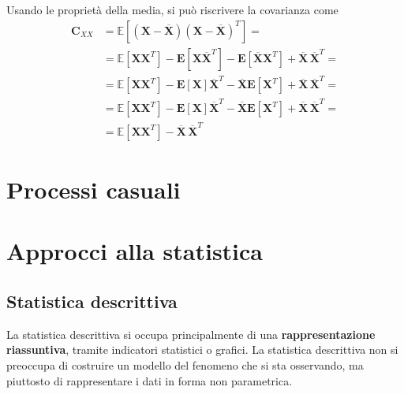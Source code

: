Usando le proprietà della media, si può riscrivere la covarianza come
\begin{equation}
\begin{aligned}
    \mathbf{C}_{XX} & = \mathbb{E}[(\mathbf{X} - \overline{\mathbf{X}})(\mathbf{X} - \overline{\mathbf{X}})^T] = \\
    & = \mathbb{E}[\mathbf{X} \mathbf{X}^T] - \mathbf{E}[\mathbf{X}\overline{\mathbf{X}}^T] - \mathbf{E}[\overline{\mathbf{X}}\mathbf{X}^T] + \overline{\mathbf{X}} \, \overline{\mathbf{X}}^T = \\
    & = \mathbb{E}[\mathbf{X} \mathbf{X}^T] - \mathbf{E}[\mathbf{X}]\overline{\mathbf{X}}^T - \overline{\mathbf{X}}\mathbf{E}[\mathbf{X}^T] + \overline{\mathbf{X}} \, \overline{\mathbf{X}}^T = \\
    & = \mathbb{E}[\mathbf{X} \mathbf{X}^T] - \mathbf{E}[\mathbf{X}]\overline{\mathbf{X}}^T - \overline{\mathbf{X}}\mathbf{E}[\mathbf{X}^T] + \overline{\mathbf{X}} \, \overline{\mathbf{X}}^T = \\
    & = \mathbb{E}[\mathbf{X} \mathbf{X}^T] - \overline{\mathbf{X}} \, \overline{\mathbf{X}}^T 
\end{aligned}
\end{equation}



\chapter{Processi casuali}


\chapter{Approcci alla statistica}
\section{Statistica descrittiva}
\begin{definition}
La statistica descrittiva si occupa principalmente di una \textbf{rappresentazione riassuntiva}, tramite indicatori statistici o grafici.
La statistica descrittiva non si preoccupa di costruire un modello del fenomeno che si sta osservando, ma piuttosto di rappresentare i dati in forma non parametrica.
\end{definition}

